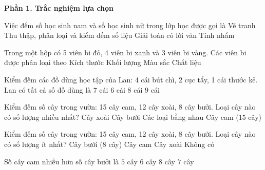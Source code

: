 \textbf{Phần 1. Trắc nghiệm lựa chọn}

\begin{ex} %
Việc đếm số học sinh nam và số học sinh nữ trong lớp học được gọi là
\choice
{Vẽ tranh}
{\True Thu thập, phân loại và kiểm đếm số liệu}
{Giải toán có lời văn}
{Tính nhẩm}
\end{ex}

\begin{ex} %
Trong một hộp có 5 viên bi đỏ, 4 viên bi xanh và 3 viên bi vàng. Các viên bi được phân loại theo
\choice
{Kích thước}
{Khối lượng}
{\True Màu sắc}
{Chất liệu}
\end{ex}

\begin{ex} %
Kiểm đếm các đồ dùng học tập của Lan: 4 cái bút chì, 2 cục tẩy, 1 cái thước kẻ. Lan có tất cả số đồ dùng là
\choice
{\True $7$ cái}
{$6$ cái}
{$8$ cái}
{$9$ cái}
\end{ex}

\begin{ex} %
Kiểm đếm số cây trong vườn: 15 cây cam, 12 cây xoài, 8 cây bưởi. Loại cây nào có số lượng nhiều nhất?
\choice
{Cây xoài}
{Cây bưởi}
{Các loại bằng nhau}
{\True Cây cam ($15$ cây)}
\end{ex}

\begin{ex} %
Kiểm đếm số cây trong vườn: 15 cây cam, 12 cây xoài, 8 cây bưởi. Loại cây nào có số lượng ít nhất?
\choice
{\True Cây bưởi ($8$ cây)}
{Cây cam}
{Cây xoài}
{Không có}
\end{ex}

\begin{ex} %
Số cây cam nhiều hơn số cây bưởi là
\choice
{$5$ cây}
{$6$ cây}
{$8$ cây}
{\True $7$ cây}
\end{ex}

